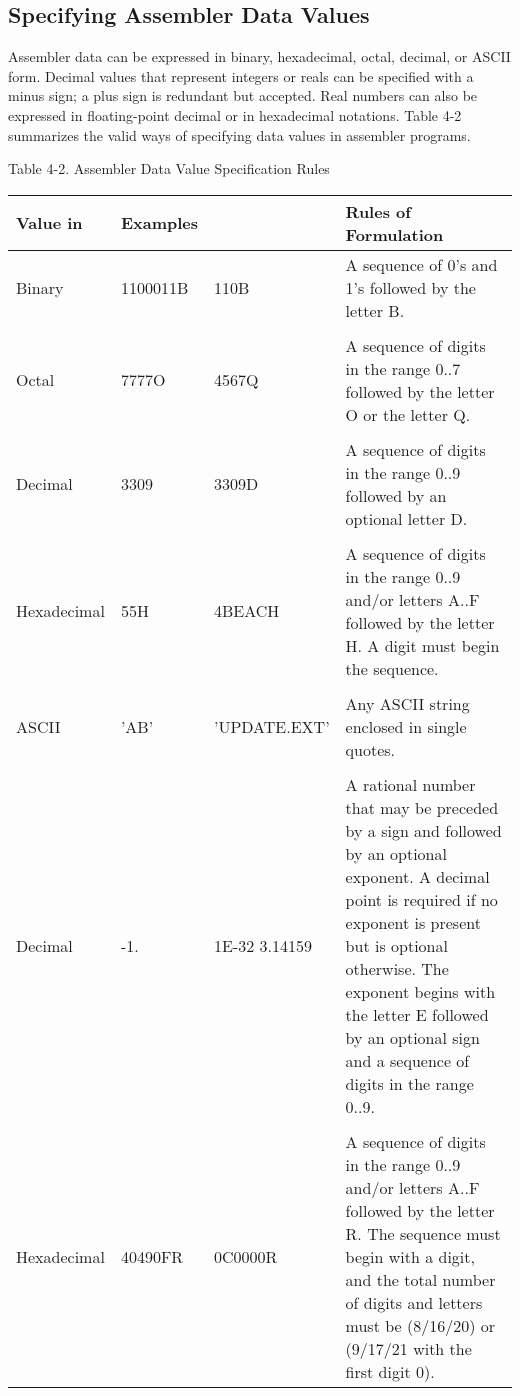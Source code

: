 \subsection*{Specifying Assembler Data Values}
Assembler data can be expressed in binary, hexadecimal, octal, decimal, or ASCII form. Decimal values that represent integers or reals can be specified with a minus sign; a plus sign is redundant but accepted. Real numbers can also be expressed in floating-point decimal or in hexadecimal notations. Table 4-2 summarizes the valid ways of specifying data values in assembler programs.

\begin{center}
Table 4-2. Assembler Data Value Specification Rules

\begin{tabular}{| l  l  l  p{6.5cm} |}
\hline
\textbf{Value in} & \textbf{Examples} & & \textbf{Rules of Formulation} \\ 
\hline
Binary & 1100011B & 110B & A sequence of 0's and 1's followed by the letter B. \\
& & & \\
Octal & 7777O & 4567Q & A sequence of digits in the range 0..7 followed by the letter O or the letter Q.\\
& & & \\
Decimal & 3309 & 3309D & A sequence of digits in the range 0..9 followed by an optional letter D.\\
& & & \\
Hexadecimal & 55H & 4BEACH & A sequence of digits in the range 0..9 and/or letters A..F followed by the letter H. A digit must begin the sequence.\\
& & & \\
ASCII & 'AB' & 'UPDATE.EXT' & Any ASCII string enclosed in single quotes.\\
& & & \\
Decimal & -1. & 1E-32 3.14159 & A rational number that may be preceded by a sign and followed by an optional exponent. A decimal point is required if no exponent is present but is optional otherwise. The exponent begins with the letter E followed by an optional sign and a sequence of digits in the range 0..9. \\ 
& & & \\
Hexadecimal & 40490FR & 0C0000R & A sequence of digits in the range 0..9 and/or letters A..F followed by the letter R. The sequence must begin with a digit, and the total number of digits and letters must be (8/16/20) or (9/17/21 with the first digit 0).
 \\
\hline
\end{tabular}
\end{center}
 
